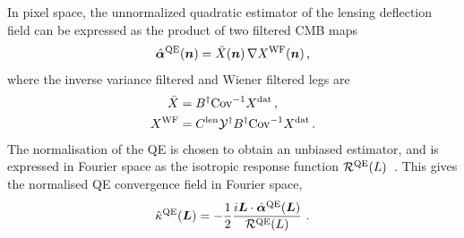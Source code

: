 \documentclass[prd, superscriptaddress, tightenlines, longbibliography, nofootinbib, eqsecnum, amsfonts, amsmath, floatfix, twocolumn, notitlepage]{revtex4-2}
\newcommand{\Cov}[0]{ {\rm{Cov}} }
\begin{document}
In pixel space, the unnormalized quadratic estimator of the lensing deflection field can be expressed as the product of two filtered CMB maps
\begin{equation}\label{Eq:QE}
    \hat {{\boldsymbol{\alpha}}}^{\rm QE}({\mbox{\boldmath{$n$}}}) = \bar X({\mbox{\boldmath{$n$}}}) \, \nabla X^{\rm WF}({\mbox{\boldmath{$n$}}}) \, ,
\end{equation}
where the inverse variance filtered and Wiener filtered legs are
\begin{equation}
    \begin{split}
        \bar X &= B^{\dagger} \Cov^{-1} X^{\rm dat} \, , \\
        X^{\rm WF} &= C^{\rm len}  \mathcal{Y}^\dagger B^{\dagger} \Cov^{-1} X^{\rm dat} \, .
    \end{split}
\end{equation}
The normalisation of the QE is chosen to obtain an unbiased estimator, and is expressed in Fourier space as the isotropic response function $\mathcal R^{\rm QE}(L)$~\cite{Hu:2001kj}.
This gives the normalised QE convergence field in Fourier space,
\begin{equation}
    \hat \kappa^{\rm QE}({\mbox{\boldmath{$L$}}}) = - \frac{1}{2} \frac{i {\mbox{\boldmath{$L$}}} \cdot \hat {{\boldsymbol{\alpha}}}^{\rm QE}({\mbox{\boldmath{$L$}}})}{\mathcal R^{\rm QE}(L)} \,  \, .
\end{equation}
\end{document}
